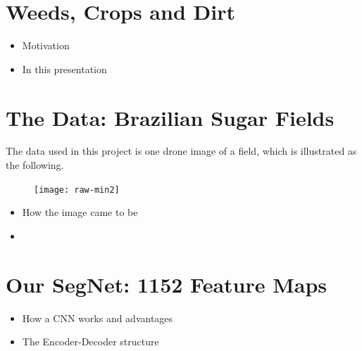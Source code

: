 \documentclass[
]{dtuposter}
\begin{document}
%
%
\begin{dtuposterhead} %
\end{dtuposterhead}
%
%
\begin{dtupostercontent}
\section{Weeds, Crops and Dirt}

\begin{itemize}
	\item Motivation
	
	\item In this presentation
\end{itemize}
 
\section{The Data: Brazilian Sugar Fields}
The data used in this project is one drone image of a field, which is illustrated as the following.
\begin{figure}
\centering
\texttt{[image: raw-min2]}
\end{figure}
\begin{itemize}
	\item How the image came to be
	
	\item 
\end{itemize}


\section{Our SegNet: 1152 Feature Maps}
\begin{itemize}
	\item How a CNN works and advantages
	
	\item The Encoder-Decoder structure
\end{itemize}



\end{dtupostercontent}
\end{document}
